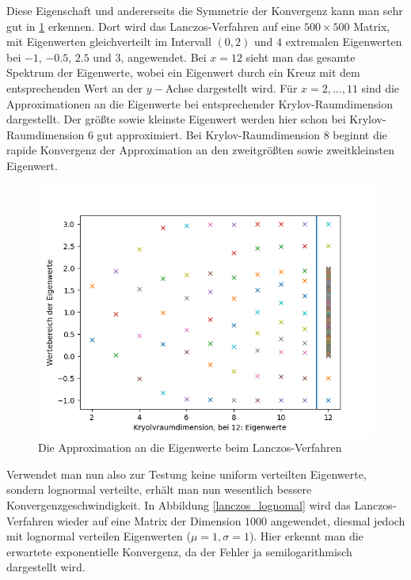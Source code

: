 \documentclass{article}
\theoremstyle{plain}
\begin{document}
Diese Eigenschaft und andererseits die Symmetrie der Konvergenz kann man sehr gut in \ref{eigv_lanczos} erkennen. Dort wird das Lanczos-Verfahren auf eine $500 \times 500$ Matrix, mit Eigenwerten gleichverteilt im Intervall $(0,2)$ und $4$ extremalen Eigenwerten bei $-1$, $-0.5$, $2.5$ und $3$, angewendet. Bei $x = 12$ sieht man das gesamte Spektrum der Eigenwerte, wobei ein Eigenwert durch ein Kreuz mit dem entsprechenden Wert an der $y-$Achse dargestellt wird. Für $x = 2,...,11$ sind die Approximationen an die Eigenwerte bei entsprechender Krylov-Raumdimension dargestellt. Der größte sowie kleinste Eigenwert werden hier schon bei Krylov-Raumdimension $6$ gut approximiert. Bei Krylov-Raumdimension $8$ beginnt die rapide Konvergenz der Approximation an den zweitgrößten sowie zweitkleinsten Eigenwert.


\begin{figure}[H]\label{eigv_lanczos}
	\begin{center}
		\includegraphics[width = 0.7 \linewidth]{Plots/eigv_kyrlov_approx}
		\caption{Die Approximation an die Eigenwerte beim Lanczos-Verfahren}
	\end{center}
\end{figure}


Verwendet man nun also zur Testung keine uniform verteilten Eigenwerte, sondern lognormal verteilte, erhält man nun wesentlich bessere Konvergenzgeschwindigkeit. In Abbildung \ref{lanczos_lognomal} wird das Lanczos-Verfahren wieder auf eine Matrix der Dimension $1000$ angewendet, diesmal jedoch mit lognormal verteilen Eigenwerten ($\mu = 1, \sigma = 1$). Hier erkennt man die erwartete exponentielle Konvergenz, da der Fehler ja semilogarithmisch dargestellt wird.
\end{document}
